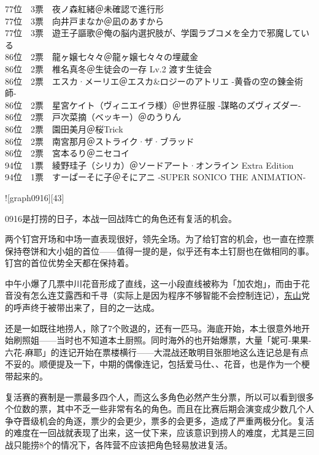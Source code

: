 {    77位　3票　夜ノ森紅緒＠未確認で進行形\\
    77位　3票　向井戸まなか＠凪のあすから\\
    77位　3票　遊王子謳歌＠俺の脳内選択肢が、学園ラブコメを全力で邪魔している\\
    86位　2票　龍ヶ嬢七々々＠龍ヶ嬢七々々の埋蔵金\\
    86位　2票　椎名真冬＠生徒会の一存 Lv.2 渡す生徒会\\
    86位　2票　エスカ·メーリエ＠エスカ\&ロジーのアトリエ -黄昏の空の錬金術師-\\
    86位　2票　星宮ケイト（ヴィニエイラ様）＠世界征服 -謀略のズヴィズダー-\\
    86位　2票　戸次菜摘（ベッキー）＠のうりん\\
    86位　2票　園田美月＠桜Trick\\
    86位　2票　南宮那月＠ストライク·ザ·ブラッド\\
    86位　2票　宮本るり＠ニセコイ\\
    94位　1票　綾野珪子（シリカ）＠ソードアート·オンライン Extra Edition\\
    94位　1票　すーぱーそに子＠そにアニ -SUPER SONICO THE ANIMATION-
}

![graph0916][43]

0916是打捞的日子，本战一回战阵亡的角色还有复活的机会。

两个钉宫开场和中场一直表现很好，领先全场。为了给钉宫的机会，也一直在控票保持卷饼和大小姐的首位——值得一提的是，似乎还有本土钉厨也在做相同的事。钉宫的首位优势全天都在保持着。

中午小爆了几票中川花音形成了直线，这一小段直线被称为「加农炮」，而由于花音没有怎么连艾露西和千寻（实际上是因为程序不够智能不会控制连记），\uline{东山}党的呼声终于被带出来了，目的之一达成。

还是一如既往地捞人，除了7个败退的，还有一匹马。海底开始，本土很意外地开始刷照姐——当时也不知道本土厨照。同时海外的也开始爆票，大量「妮可-果果-六花-麻耶」的连记开始在票楼横行——大混战还敢明目张胆地这么连记总是有点不妥的。顺便提及一下，中期的偶像连记，包括爱马仕、、花音，也是作为一个梗带起来的。

复活赛的赛制是一票最多四个人，而这么多角色必然产生分票，所以可以看到很多个位数的票，其中不乏一些非常有名的角色。而且在比赛后期会演变成少数几个人争夺晋级机会的角逐，票少的会更少，票多的会更多，造成了严重两极分化。复活的难度在一回战就表现了出来，这一仗下来，应该意识到捞人的难度，尤其是三回战只能捞8个的情况下，各阵营不应该把角色轻易放进复活。

